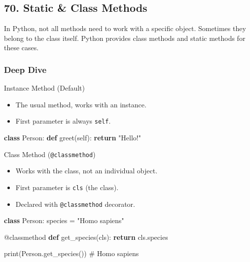 \documentclass[
  letterpaper,
  DIV=11,
  numbers=noendperiod]{scrreprt}
\newenvironment{Shaded}{\begin{snugshade}}{\end{snugshade}}
\newcommand{\AttributeTok}[1]{\textcolor[rgb]{0.40,0.45,0.13}{#1}}
\newcommand{\BuiltInTok}[1]{\textcolor[rgb]{0.00,0.23,0.31}{#1}}
\newcommand{\CommentTok}[1]{\textcolor[rgb]{0.37,0.37,0.37}{#1}}
\newcommand{\ControlFlowTok}[1]{\textcolor[rgb]{0.00,0.23,0.31}{\textbf{#1}}}
\newcommand{\KeywordTok}[1]{\textcolor[rgb]{0.00,0.23,0.31}{\textbf{#1}}}
\newcommand{\NormalTok}[1]{\textcolor[rgb]{0.00,0.23,0.31}{#1}}
\newcommand{\OperatorTok}[1]{\textcolor[rgb]{0.37,0.37,0.37}{#1}}
\newcommand{\StringTok}[1]{\textcolor[rgb]{0.13,0.47,0.30}{#1}}
\newcommand{\VariableTok}[1]{\textcolor[rgb]{0.07,0.07,0.07}{#1}}
\providecommand{\tightlist}{%
  \setlength{\itemsep}{0pt}\setlength{\parskip}{0pt}}
\begin{document}
\subsection{70. Static \& Class Methods}\label{static-class-methods}

In Python, not all methods need to work with a specific object.
Sometimes they belong to the class itself. Python provides class methods
and static methods for these cases.

\subsubsection{Deep Dive}\label{deep-dive-69}

Instance Method (Default)

\begin{itemize}
\tightlist
\item
  The usual method, works with an instance.
\item
  First parameter is always \texttt{self}.
\end{itemize}

\begin{Shaded}
\begin{Highlighting}[]
\KeywordTok{class}\NormalTok{ Person:}
    \KeywordTok{def}\NormalTok{ greet(}\VariableTok{self}\NormalTok{):}
        \ControlFlowTok{return} \StringTok{"Hello!"}
\end{Highlighting}
\end{Shaded}

Class Method (\texttt{@classmethod})

\begin{itemize}
\tightlist
\item
  Works with the class, not an individual object.
\item
  First parameter is \texttt{cls} (the class).
\item
  Declared with \texttt{@classmethod} decorator.
\end{itemize}

\begin{Shaded}
\begin{Highlighting}[]
\KeywordTok{class}\NormalTok{ Person:}
\NormalTok{    species }\OperatorTok{=} \StringTok{"Homo sapiens"}

    \AttributeTok{@classmethod}
    \KeywordTok{def}\NormalTok{ get\_species(cls):}
        \ControlFlowTok{return}\NormalTok{ cls.species}

\BuiltInTok{print}\NormalTok{(Person.get\_species())  }\CommentTok{\# Homo sapiens}
\end{Highlighting}
\end{Shaded}
\end{document}
